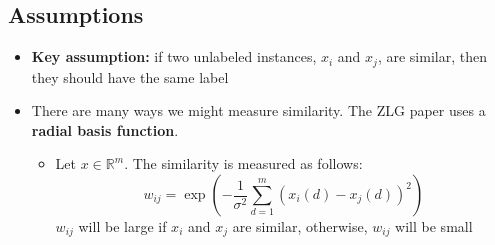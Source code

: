 \documentclass[10pt]{article}
\begin{document}
\subsection*{Assumptions}
\begin{itemize}
	\item \textbf{Key assumption:} if two unlabeled instances, $x_i$ and $x_j$, are similar, then they should have the same label
	\item There are many ways we might measure similarity.  The ZLG paper uses a \textbf{radial basis function}.
	\begin{itemize}
	    \item Let $x \in \mathbb{R}^m$.  The similarity is measured as follows:
	    \[w_{ij} = \exp \left(-\frac{1}{\sigma^2} \sum_{d = 1}^m (x_i(d) - x_j(d))^2\right)\]
        $w_{ij}$ will be large if $x_i$ and $x_j$ are similar, otherwise, $w_{ij}$ will be small
    \end{itemize}
\end{itemize}
\end{document}
